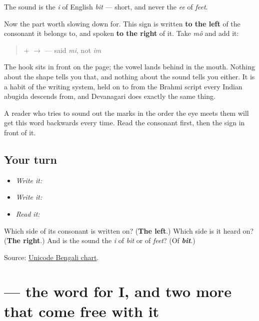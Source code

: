\begin{quote}
\end{quote}

The sound is the \emph{i} of English \emph{bit} — short, and never the \emph{ee} of \emph{feet}.

Now the part worth slowing down for. This sign is written \textbf{to the left} of the consonant it belongs to, and spoken \textbf{to the right} of it. Take \textbf{} \emph{mô} and add it:

\begin{quote}
\textbf{} + \textbf{} $\to$ \textbf{} — said \emph{mi}, not \emph{im}
\end{quote}

The hook sits in front on the page; the vowel lands behind in the mouth. Nothing about the shape tells you that, and nothing about the sound tells you either. It is a habit of the writing system, held on to from the Brahmi script every Indian abugida descends from, and Devanagari does exactly the same thing.

A reader who tries to sound out the marks in the order the eye meets them will get this word backwards every time. Read the consonant first, then the sign in front of it.

\subsection*{Your turn}
\begin{itemize}
\raggedright
  \item \emph{Write it:} 
  \item \emph{Write it:} 
  \item \emph{Read it:} 
\end{itemize}

\begin{tcolorbox}[breakable,colback=teal!4,colframe=teal!35!black,title={Before you move on}]
Which side of its consonant is \textbf{} written on? (\textbf{The left}.) Which side is it heard on? (\textbf{The right}.) And is the sound the \emph{i} of \emph{bit} or of \emph{feet}? (Of \emph{\textbf{bit}}.)

Source: \href{https://www.unicode.org/charts/PDF/U0980.pdf}{Unicode Bengali chart}.
\end{tcolorbox}
\section[āmi]{ — the word for I, and two more that come free with it}

